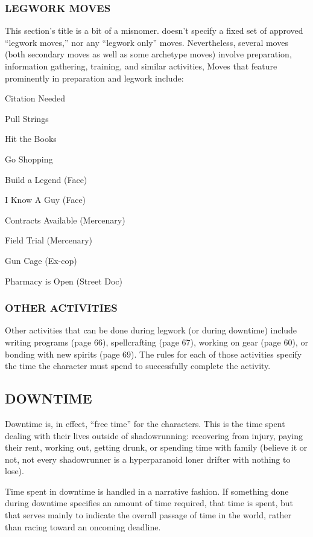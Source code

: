 \documentclass[oneside,10pt]{article}
\begin{document}
\begin{multicols}{2}
\subsubsection{LEGWORK MOVES}
This section’s title is a bit of a misnomer. \SW{} doesn’t
specify a fixed set of approved “legwork moves,” nor any
“legwork only” moves. Nevertheless, several moves (both
secondary moves as well as some archetype moves) involve
preparation, information gathering, training, and similar activities, Moves that feature prominently in preparation and
legwork include:
\begin{adjustwidth*}{.5cm}{.5cm}
\tcirc{} Citation Needed

\tcirc{} Pull Strings

\tcirc{} Hit the Books

\tcirc{} Go Shopping

\tcirc{} Build a Legend (Face)

\tcirc{} I Know A Guy (Face)

\tcirc{} Contracts Available (Mercenary)

\tcirc{} Field Trial (Mercenary)

\tcirc{} Gun Cage (Ex-cop)

\tcirc{} Pharmacy is Open (Street Doc)
\end{adjustwidth*}

\subsubsection{OTHER ACTIVITIES}
Other activities that can be done during legwork (or during
downtime) include writing programs (page 66), spellcrafting (page 67), working on gear (page 60), or bonding
with new spirits (page 69). The rules for each of those activities specify the time the character must spend to successfully complete the activity.

\subsection{DOWNTIME}
Downtime is, in effect, “free time” for the characters. This is
the time spent dealing with their lives outside of shadowrunning: recovering from injury, paying their rent, working out,
getting drunk, or spending time with family (believe it or not,
not every shadowrunner is a hyperparanoid loner drifter with
nothing to lose).

Time spent in downtime is handled in a narrative fashion.
If something done during downtime specifies an amount of
time required, that time is spent, but that serves mainly to
indicate the overall passage of time in the world, rather than
racing toward an oncoming deadline.


\end{multicols}
\end{document}
